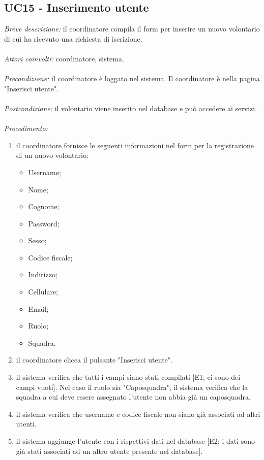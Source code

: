\subsection{UC15 - Inserimento utente}
\textit{Breve descrizione:} il coordinatore compila il form per inserire un nuovo volontario di cui ha ricevuto una richiesta di iscrizione. 
\\
\\
\textit{Attori coinvolti:} coordinatore, sistema.
\\
\\
\textit{Precondizione:} il coordinatore è loggato nel sistema. Il coordinatore è nella pagina "Inserisci utente".
\\
\\
\textit{Postcondizione:} il volontario viene inserito nel database e può accedere ai servizi.
\\
\\
\textit{Procedimento:}
\begin{enumerate}
	\item il coordinatore fornisce le seguenti informazioni nel form per la registrazione di un nuovo volontario:
	\begin{itemize}
		\item Username;
		\item Nome;
		\item Cognome;
		\item Password;
		\item Sesso;
		\item Codice fiscale;
		\item Indirizzo;
		\item Cellulare;
		\item Email;
		\item Ruolo;
		\item Squadra.
	\end{itemize}
	\item il coordinatore clicca il pulsante "Inserisci utente".
	\item il sistema verifica che tutti i campi siano stati compilati [E1; ci sono dei campi vuoti]. Nel caso il ruolo sia "Caposquadra", il sistema verifica che la squadra a cui deve essere assegnato l'utente non abbia già un caposquadra. 
	\item il sistema verifica che username e codice fiscale non siano già associati ad altri utenti.
	\item il sistema aggiunge l'utente con i rispettivi dati nel database [E2: i dati sono già stati associati ad un altro utente presente nel database].
\end{enumerate}



